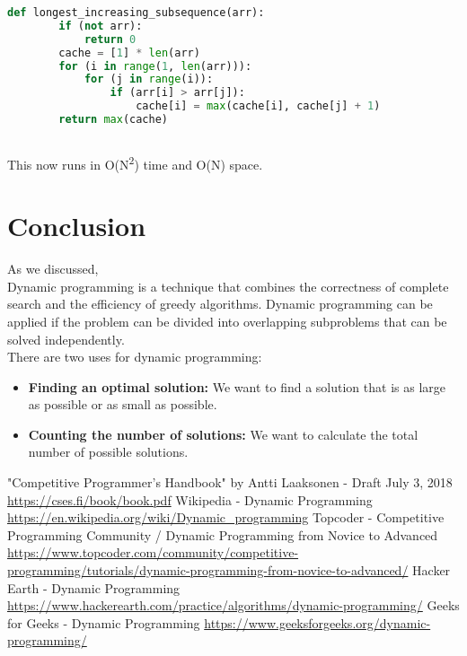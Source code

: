 \documentclass[12pt]{article}
\begin{document}
    
    \begin{lstlisting}[language=Python]
	def longest_increasing_subsequence(arr):
        if (not arr):
            return 0
        cache = [1] * len(arr)
        for (i in range(1, len(arr))):
            for (j in range(i)):
                if (arr[i] > arr[j]):
                    cache[i] = max(cache[i], cache[j] + 1)
        return max(cache)
        
    \end{lstlisting}
    
    This now runs in O(N\textsuperscript{2}) time and O(N) space.
	\newpage
	\section{Conclusion}
	As we discussed,\\
	Dynamic programming is a technique that combines the correctness of complete search and the efficiency of greedy algorithms. Dynamic programming can be applied if the problem can be divided into overlapping subproblems that can be solved independently.\\
	There are two uses for dynamic programming:
	\begin{itemize}
	    \item \textbf{Finding an optimal solution:} We want to find a solution that is as large
as possible or as small as possible.
        \item \textbf{Counting the number of solutions:} We want to calculate the total number of possible solutions.
	\end{itemize}
	\newpage
	\begin{thebibliography}{0}
		
		"Competitive Programmer’s Handbook" by Antti Laaksonen - Draft July 3, 2018 \url{https://cses.fi/book/book.pdf}
		Wikipedia - Dynamic Programming
		\url{https://en.wikipedia.org/wiki/Dynamic_programming}
		Topcoder - Competitive Programming Community / Dynamic Programming from Novice to Advanced
		\url{https://www.topcoder.com/community/competitive-programming/tutorials/dynamic-programming-from-novice-to-advanced/}
		Hacker Earth - Dynamic Programming
		\url{https://www.hackerearth.com/practice/algorithms/dynamic-programming/}
		Geeks for Geeks - Dynamic Programming \url{https://www.geeksforgeeks.org/dynamic-programming/}
	\end{thebibliography}
\end{document}

